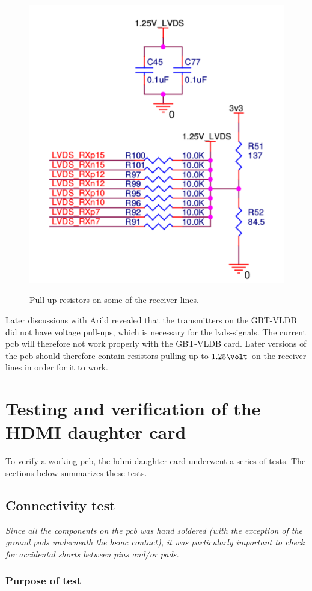 \documentclass[main.tex]{subfiles}
\begin{document}
\begin{figure}[H] %
\includegraphics[width = 7 cm]{../img/pullups}  \\[0.1 cm]
\caption{Pull-up resistors on some of the receiver lines.}
\label{fig:pullups}
\end{figure}

Later discussions with Arild revealed that the transmitters on the GBT-VLDB did not have voltage pull-ups, which is necessary for the \gls{lvds}-signals. The current \gls{pcb} will therefore not work properly with the GBT-VLDB card. Later versions of the \gls{pcb} should therefore contain resistors pulling up to $1.25 \volt$ on the receiver lines in order for it to work.

\chapter{Testing and verification of the HDMI daughter card}
To verify a working \gls{pcb}, the \gls{hdmi} daughter card underwent a series of tests. The sections below summarizes these tests. 

\section{Connectivity test}

\textit{Since all the components on the \gls{pcb} was hand soldered (with the exception of the ground pads underneath the \gls{hsmc} contact), it was particularly important to check for accidental shorts between pins and/or pads.}

\subsection{Purpose of test}
\end{document}
